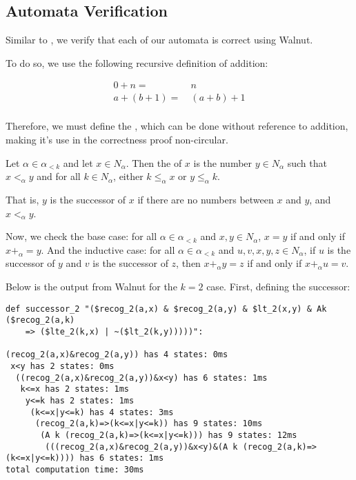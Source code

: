 \subsection{Automata Verification}

Similar to , we verify that each of our automata is correct using Walnut.

To do so, we use the following recursive definition of addition:

\begin{equation*}
    \begin{split}
        0 + n =&~n \\
        a + (b + 1) =&~(a + b) + 1\\
    \end{split}
\end{equation*}

Therefore, we must define the , which can be done without reference to addition, making it's use in the correctness proof non-circular.

\begin{definition}
Let $\alpha \in \alpha_{<k}$ and let $x \in N_{\alpha}$.
Then the  of $x$ is the number $y \in N_{\alpha}$ such that $x <_{\alpha} y$ and for all $k \in N_{\alpha}$, either $k \leq_{\alpha} x$ or $y \leq_{\alpha} k$.
\end{definition}

That is, $y$ is the successor of $x$ if there are no numbers between $x$ and $y$, and $x <_{\alpha} y$.

Now, we check the base case: for all $\alpha \in \alpha_{<k}$ and $x,y \in N_{\alpha}$, $x = y$ if and only if $x +_{\alpha} = y$.
And the inductive case: for all $\alpha \in \alpha_{<k}$ and $u,v,x,y,z \in N_{\alpha}$, if $u$ is the successor of $y$ and $v$ is the successor of $z$, then $x +_{\alpha} y = z$ if and only if $x +_{\alpha} u = v$.

Below is the output from Walnut for the $k=2$ case.
First, defining the successor:

\begin{lstlisting}[basicstyle=\scriptsize\ttfamily]
def successor_2 "($recog_2(a,x) & $recog_2(a,y) & $lt_2(x,y) & Ak ($recog_2(a,k) 
    => ($lte_2(k,x) | ~($lt_2(k,y)))))":
    
(recog_2(a,x)&recog_2(a,y)) has 4 states: 0ms
 x<y has 2 states: 0ms
  ((recog_2(a,x)&recog_2(a,y))&x<y) has 6 states: 1ms
   k<=x has 2 states: 1ms
    y<=k has 2 states: 1ms
     (k<=x|y<=k) has 4 states: 3ms
      (recog_2(a,k)=>(k<=x|y<=k)) has 9 states: 10ms
       (A k (recog_2(a,k)=>(k<=x|y<=k))) has 9 states: 12ms
        (((recog_2(a,x)&recog_2(a,y))&x<y)&(A k (recog_2(a,k)=>(k<=x|y<=k)))) has 6 states: 1ms
total computation time: 30ms
\end{lstlisting}

